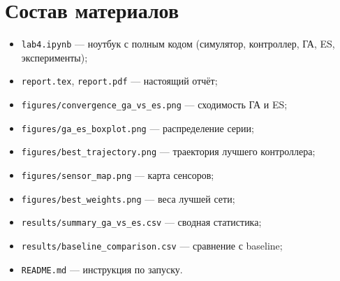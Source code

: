 \documentclass[12pt,a4paper]{article}
\begin{document}
\section*{Состав материалов}

\begin{itemize}
\item \texttt{lab4.ipynb} --- ноутбук с полным кодом (симулятор, контроллер,
  ГА, ES, эксперименты);
\item \texttt{report.tex}, \texttt{report.pdf} --- настоящий отчёт;
\item \texttt{figures/convergence\_ga\_vs\_es.png} --- сходимость ГА и ES;
\item \texttt{figures/ga\_es\_boxplot.png} --- распределение серии;
\item \texttt{figures/best\_trajectory.png} --- траектория лучшего контроллера;
\item \texttt{figures/sensor\_map.png} --- карта сенсоров;
\item \texttt{figures/best\_weights.png} --- веса лучшей сети;
\item \texttt{results/summary\_ga\_vs\_es.csv} --- сводная статистика;
\item \texttt{results/baseline\_comparison.csv} --- сравнение с baseline;
\item \texttt{README.md} --- инструкция по запуску.
\end{itemize}
\end{document}
